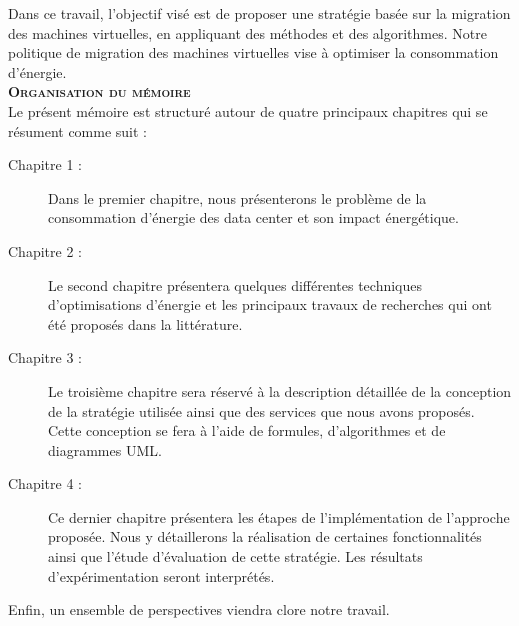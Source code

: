 \begin{onehalfspace}
Dans ce travail, l’objectif visé est de proposer une stratégie basée sur la migration des machines virtuelles, en appliquant des méthodes et des algorithmes. Notre politique de migration des machines virtuelles vise à optimiser la consommation d’énergie.\\

{\scshape\bfseries Organisation du mémoire}\\

Le présent mémoire est structuré autour de quatre principaux chapitres qui se résument comme suit :
\begin{description}
\item[Chapitre 1 :] Dans le premier chapitre, nous présenterons le problème de la consommation d’énergie des data center et son impact énergétique.
\item[Chapitre 2 :] Le second chapitre présentera quelques différentes techniques d’optimisations d’énergie et les principaux travaux de recherches qui ont été proposés dans la littérature.
\item[Chapitre 3 :] Le troisième chapitre sera réservé à la description détaillée de la conception de la stratégie utilisée ainsi que des services que nous avons proposés. Cette conception se fera à l’aide de formules, d’algorithmes et de diagrammes UML.
\item[Chapitre 4 :] Ce dernier chapitre présentera les étapes de l’implémentation de l’approche proposée. Nous y détaillerons la réalisation de certaines fonctionnalités ainsi que l’étude d’évaluation de cette stratégie. Les résultats d’expérimentation seront interprétés.
\end{description}

Enfin, un ensemble de perspectives viendra clore notre travail.

\end{onehalfspace}

